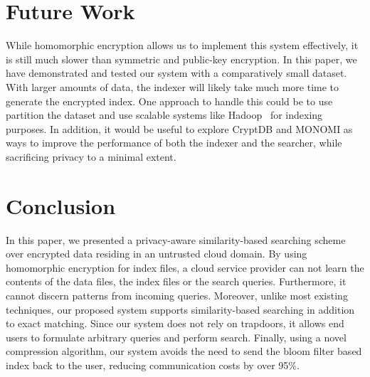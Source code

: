 \section{Future Work}

While homomorphic encryption allows us to implement this system effectively, 
it is still much slower than symmetric and public-key encryption.
In this paper, we have demonstrated and tested our system with a comparatively 
small dataset. With larger amounts of data, the indexer will likely take 
much more time to generate the
encrypted index. One approach to handle this could be to use partition the
dataset and use scalable systems like Hadoop~\cite{hadoop} for indexing
purposes. In addition, it would be useful to explore CryptDB and MONOMI as
ways to improve the performance of both the indexer and the searcher, while
sacrificing privacy to a minimal extent.


\section{Conclusion}
\label{sec:conclusion}

In this paper, we presented a privacy-aware similarity-based searching scheme
over encrypted data residing in an untrusted cloud domain. By using homomorphic 
encryption for index files, a cloud service provider can not learn the contents of 
the data files, the index files or the search queries. Furthermore, it cannot 
discern patterns from incoming queries. Moreover, unlike most existing techniques, our
proposed system supports similarity-based searching in addition to exact matching.
Since our system does not rely on trapdoors, it allows end users to formulate
arbitrary queries and perform search. Finally, using a novel compression 
algorithm, our system avoids the need to send the bloom filter based index back to the 
user, reducing communication costs by over 95\%.

